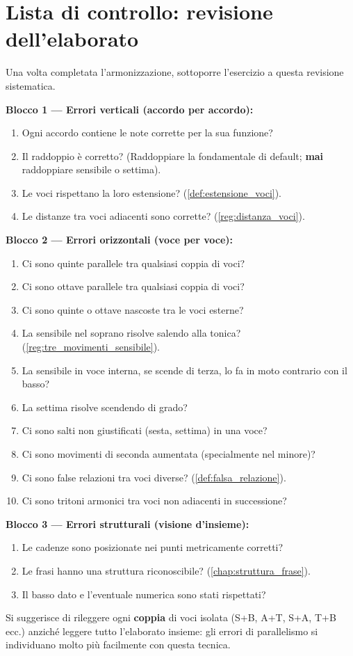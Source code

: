 \section{Lista di controllo: revisione dell'elaborato}

\begin{regola}
\label{reg:checklist_errori}
Una volta completata l'armonizzazione, sottoporre l'esercizio a questa revisione sistematica.

\textbf{Blocco 1 — Errori verticali (accordo per accordo):}
\begin{enumerate}
	\item Ogni accordo contiene le note corrette per la sua funzione?
	\item Il raddoppio è corretto? (Raddoppiare la fondamentale di default; \textbf{mai} raddoppiare sensibile o settima).
	\item Le voci rispettano la loro estensione? (\ref{def:estensione_voci}).
	\item Le distanze tra voci adiacenti sono corrette? (\ref{reg:distanza_voci}).
\end{enumerate}

\textbf{Blocco 2 — Errori orizzontali (voce per voce):}
\begin{enumerate}
	\item Ci sono quinte parallele tra qualsiasi coppia di voci?
	\item Ci sono ottave parallele tra qualsiasi coppia di voci?
	\item Ci sono quinte o ottave nascoste tra le voci esterne?
	\item La sensibile nel soprano risolve salendo alla tonica? (\ref{reg:tre_movimenti_sensibile}).
	\item La sensibile in voce interna, se scende di terza, lo fa in moto contrario con il basso?
	\item La settima risolve scendendo di grado?
	\item Ci sono salti non giustificati (sesta, settima) in una voce?
	\item Ci sono movimenti di seconda aumentata (specialmente nel minore)?
	\item Ci sono false relazioni tra voci diverse? (\ref{def:falsa_relazione}).
	\item Ci sono tritoni armonici tra voci non adiacenti in successione?
\end{enumerate}

\textbf{Blocco 3 — Errori strutturali (visione d'insieme):}
\begin{enumerate}
	\item Le cadenze sono posizionate nei punti metricamente corretti?
	\item Le frasi hanno una struttura riconoscibile? (\ref{chap:struttura_frase}).
	\item Il basso dato e l'eventuale numerica sono stati rispettati?
\end{enumerate}
\end{regola}

Si suggerisce di rileggere ogni \textbf{coppia} di voci isolata (S+B, A+T, S+A, T+B ecc.) anziché leggere tutto l'elaborato insieme: gli errori di parallelismo si individuano molto più facilmente con questa tecnica.
